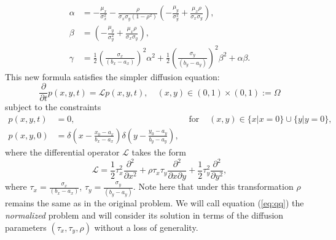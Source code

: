 \documentclass[10pt]{article}
\begin{document}
\begin{align*}
  \alpha &= -\frac{\mu_x}{\sigma_x^2} - \frac{\rho}{\sigma_x\sigma_y(1-\rho^2)}\left( -\frac{\mu_y}{\sigma_y^2} + \frac{\mu_x \rho}{\sigma_x \sigma_y} \right), \\
  \beta &= \left( -\frac{\mu_y}{\sigma_y^2} + \frac{\mu_x \rho}{\sigma_x \sigma_y} \right), \\
  \gamma &= \frac{1}{2}\left( \frac{\sigma_x}{(b_x-a_x)} \right)^2 \alpha^2 + \frac{1}{2}\left(\frac{\sigma_y}{(b_y-a_y)}\right)^2 \beta^2 + \alpha\beta.
\end{align*}
This new formula satisfies the simpler diffusion equation:
\begin{equation}
  \frac{\partial}{\partial t} p(x,y,t) = \mathcal{L}p(x,y,t),\quad (x,y) \in (0,1) \times (0,1) := \Omega \label{eq:qq}
\end{equation}
subject to the constraints
\begin{align}
  p(x,y,t) &=0, & \mbox{ for } & (x,y) \in \{ x | x = 0\} \cup \{ y | y = 0\}, \nonumber \\
  p(x,y,0) &= \delta\left( x - \frac{x_0-a_x}{b_x - a_x} \right) \delta\left(y-\frac{y_0 - a_y}{b_y - a_y}\right), \nonumber
\end{align}
where the differential operator $\mathcal{L}$ takes the form
\[
  \mathcal{L} = \frac{1}{2} \tau_x^2 \frac{\partial^2}{\partial x^2}
  + \rho\tau_x\tau_y \frac{\partial^2}{\partial x \partial y} + \frac{1}{2}\tau_y^2 \frac{\partial^2}{\partial y^2},
\]
where $\tau_x = \frac{\sigma_x}{(b_x-a_x)}$,
$\tau_y = \frac{\sigma_y}{(b_y-a_y)}$.  Note here that under this
transformation $\rho$ remains the same as in the original problem. We
will call equation (\ref{eq:qq}) the \textit{normalized} problem and
will consider its solution in terms of the diffusion parameters
$(\tau_x, \tau_y, \rho)$ without a loss of generality.
\end{document}
